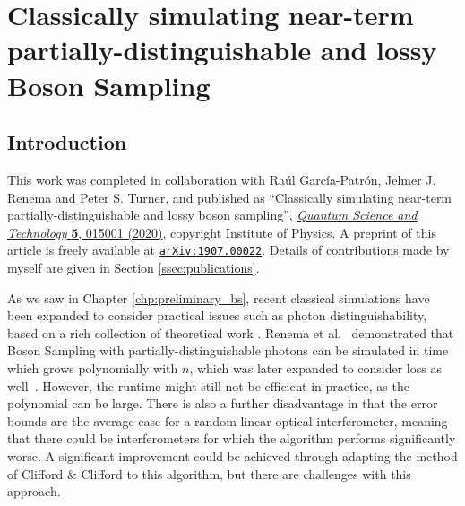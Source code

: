 \chapter{Classically simulating near-term partially-distinguishable and lossy Boson Sampling}
\label{chp:classical_sim}

\section{Introduction}

This work was completed in collaboration with Ra\'ul Garc\'ia-Patr\'on, Jelmer J. Renema and Peter S. Turner, and published as ``Classically simulating near-term partially-distinguishable and lossy boson sampling'', \href{https://iopscience.iop.org/article/10.1088/2058-9565/ab5555}{\textit{Quantum Science and Technology} \textbf{5}, 015001 (2020)}, copyright Institute of Physics. A preprint of this article is freely available at {\tt \href{https://arxiv.org/abs/1907.00022}{arXiv:1907.00022}}. Details of contributions made by myself are given in Section \ref{ssec:publications}.

As we saw in Chapter \ref{chp:preliminary_bs}, recent classical simulations have been expanded to consider practical issues such as photon distinguishability, based on a rich collection of theoretical work \cite{deguise2014, tamma2014, shchesnovich2014, rohde2015, shchesnovich2015, tichy2015, tillmann2015}. 
Renema et al.~\cite{renema2018} demonstrated that Boson Sampling with partially-distinguishable photons can be simulated in time which grows polynomially with $n$, which was later expanded to consider loss as well~\cite{renema2018loss}. 
However, the runtime might still not be efficient in practice, as the polynomial can be large. There is also a further disadvantage in that the error bounds are the average case for a random linear optical interferometer, meaning that there could be interferometers for which the algorithm performs significantly worse.
A significant improvement could be achieved through adapting the method of Clifford \& Clifford to this algorithm, but there are challenges with this approach.


